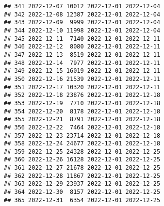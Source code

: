 \documentclass[
]{article}
\newenvironment{Shaded}{\begin{snugshade}}{\end{snugshade}}
\newcommand{\FunctionTok}[1]{\textcolor[rgb]{0.13,0.29,0.53}{\textbf{#1}}}
\newcommand{\NormalTok}[1]{#1}
\newcommand{\SpecialCharTok}[1]{\textcolor[rgb]{0.81,0.36,0.00}{\textbf{#1}}}
\begin{document}
\begin{verbatim}
## 341 2022-12-07 10012 2022-12-01 2022-12-04
## 342 2022-12-08 12387 2022-12-01 2022-12-04
## 343 2022-12-09  9999 2022-12-01 2022-12-04
## 344 2022-12-10 11998 2022-12-01 2022-12-04
## 345 2022-12-11  7140 2022-12-01 2022-12-11
## 346 2022-12-12  8080 2022-12-01 2022-12-11
## 347 2022-12-13  8519 2022-12-01 2022-12-11
## 348 2022-12-14  7977 2022-12-01 2022-12-11
## 349 2022-12-15 16019 2022-12-01 2022-12-11
## 350 2022-12-16 21539 2022-12-01 2022-12-11
## 351 2022-12-17 10320 2022-12-01 2022-12-11
## 352 2022-12-18 23876 2022-12-01 2022-12-18
## 353 2022-12-19  7710 2022-12-01 2022-12-18
## 354 2022-12-20  8178 2022-12-01 2022-12-18
## 355 2022-12-21  8791 2022-12-01 2022-12-18
## 356 2022-12-22  7464 2022-12-01 2022-12-18
## 357 2022-12-23 23714 2022-12-01 2022-12-18
## 358 2022-12-24 24677 2022-12-01 2022-12-18
## 359 2022-12-25 24328 2022-12-01 2022-12-25
## 360 2022-12-26 16128 2022-12-01 2022-12-25
## 361 2022-12-27 21678 2022-12-01 2022-12-25
## 362 2022-12-28 11867 2022-12-01 2022-12-25
## 363 2022-12-29 23937 2022-12-01 2022-12-25
## 364 2022-12-30  8157 2022-12-01 2022-12-25
## 365 2022-12-31  6354 2022-12-01 2022-12-25
\end{verbatim}

\begin{Shaded}
\end{Shaded}
\end{document}
